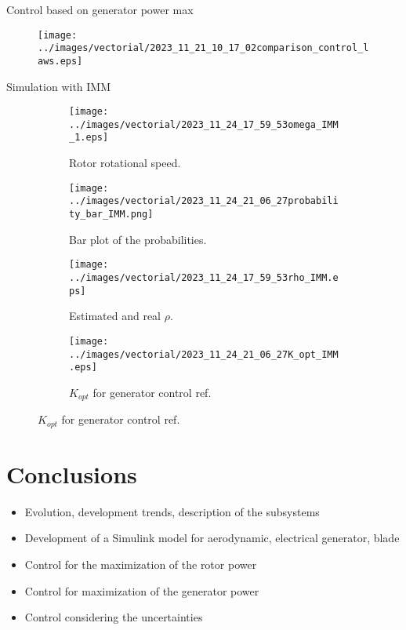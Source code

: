 \begin{frame}{Control based on generator power max}
  \begin{figure}
    \centering
    \texttt{[image: ../images/vectorial/2023\_11\_21\_10\_17\_02comparison\_control\_laws.eps]}
  \end{figure}
\end{frame}

\begin{frame}{Simulation with IMM}
  \begin{figure}[!htbp]
    \begin{subfigure}{0.49\columnwidth}
      \centering
      \texttt{[image: ../images/vectorial/2023\_11\_24\_17\_59\_53omega\_IMM\_1.eps]}
      \caption{Rotor rotational speed.}
    \end{subfigure}
    \begin{subfigure}{0.49\columnwidth}
      \centering
      \texttt{[image: ../images/vectorial/2023\_11\_24\_21\_06\_27probability\_bar\_IMM.png]}
      \caption{Bar plot of the probabilities.}
    \end{subfigure}
    \begin{subfigure}{0.49\columnwidth}
      \centering
      \texttt{[image: ../images/vectorial/2023\_11\_24\_17\_59\_53rho\_IMM.eps]}
      \caption{Estimated and real $\rho$.}
    \end{subfigure}
    \begin{subfigure}{0.49\columnwidth}
      \centering
      \texttt{[image: ../images/vectorial/2023\_11\_24\_21\_06\_27K\_opt\_IMM.eps]}
      \caption{$K_{opt}$ for generator control ref. }
    \end{subfigure}
  \end{figure}
\end{frame}

                                                      
\section{Conclusions}
\begin{frame}
  \begin{itemize}
    \item Evolution, development trends, description of the subsystems
    \item Development of a Simulink model for aerodynamic, electrical generator, blade 
    \item Control for the maximization of the rotor power
    \item Control for maximization of the generator power
    \item Control considering the uncertainties
  \end{itemize}
\end{frame}

